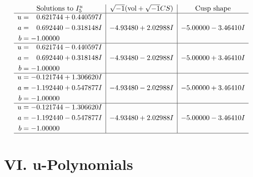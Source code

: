 \documentclass[1p]{elsarticle_modified}
\theoremstyle{definition}
\newcommand{\I}{\sqrt{-1}}
\begin{document}
$$\begin{array}{c|c|c}  
\text{Solutions to }I^u_{5}& \I (\text{vol} + \sqrt{-1}CS) & \text{Cusp shape}\\
 \hline 
\begin{aligned}
u &= \phantom{-}0.621744 + 0.440597 I \\
a &= \phantom{-}0.692440 - 0.318148 I \\
b &= -1.00000\phantom{ +0.000000I}\end{aligned}
 & -4.93480 + 2.02988 I & -5.00000 - 3.46410 I \\ \hline\begin{aligned}
u &= \phantom{-}0.621744 - 0.440597 I \\
a &= \phantom{-}0.692440 + 0.318148 I \\
b &= -1.00000\phantom{ +0.000000I}\end{aligned}
 & -4.93480 - 2.02988 I & -5.00000 + 3.46410 I \\ \hline\begin{aligned}
u &= -0.121744 + 1.306620 I \\
a &= -1.192440 + 0.547877 I \\
b &= -1.00000\phantom{ +0.000000I}\end{aligned}
 & -4.93480 - 2.02988 I & -5.00000 + 3.46410 I \\ \hline\begin{aligned}
u &= -0.121744 - 1.306620 I \\
a &= -1.192440 - 0.547877 I \\
b &= -1.00000\phantom{ +0.000000I}\end{aligned}
 & -4.93480 + 2.02988 I & -5.00000 - 3.46410 I\\
 \hline 
 \end{array}$$\newpage
\newpage\renewcommand{\arraystretch}{1}
\centering \section*{ VI. u-Polynomials}
\end{document}
